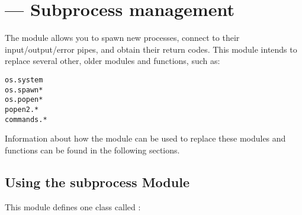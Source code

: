 \section{ --- Subprocess management}



The  module allows you to spawn new processes,
connect to their input/output/error pipes, and obtain their return
codes.  This module intends to replace several other, older modules
and functions, such as:

\begin{verbatim}
os.system
os.spawn*
os.popen*
popen2.*
commands.*
\end{verbatim}

Information about how the  module can be used to
replace these modules and functions can be found in the following
sections.

\subsection{Using the subprocess Module}

This module defines one class called :

